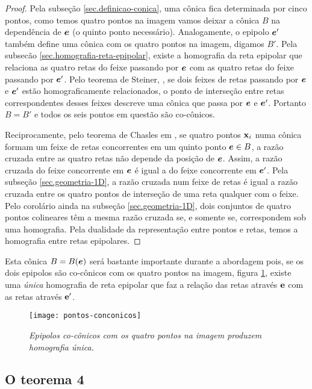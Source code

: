 \begin{proof}
Pela subseção \ref{sec.definicao-conica}, uma cônica fica determinada por cinco pontos, como temos quatro pontos na imagem vamos deixar a cônica $B$ na dependência de $\boldsymbol{e}$ (o quinto ponto necessário). Analogamente, o epipolo $\boldsymbol{e}'$ também define uma cônica com os quatro pontos na imagem, digamos $B'$. Pela subsec\~ao \ref{sec.homografia-reta-epipolar}, existe a homografia da reta epipolar que relaciona as quatro retas do feixe passando por $\boldsymbol{e}$ com as quatro retas do feixe passando por $\boldsymbol{e}'$. Pelo teorema de Steiner, \citep{kneebone}, se dois feixes de retas passando por $\boldsymbol{e}$ e $\boldsymbol{e}'$ estão homograficamente relacionados, o ponto de interseção entre retas correspondentes desses feixes descreve uma cônica que passa por $\boldsymbol{e}$ e $\boldsymbol{e}'$. Portanto $B=B'$ e todos os seis pontos em questão são co-cônicos.


Reciprocamente, pelo teorema de Chasles em \citep{kneebone}, se quatro pontos $\mathbf{x}_i$ numa cônica formam um feixe de retas concorrentes em um quinto ponto $\boldsymbol{e}\in B$, a razão cruzada entre as quatro retas não depende da posição de $\boldsymbol{e}$. Assim, a razão cruzada  do feixe concorrente em $\boldsymbol{e}$ é igual a do feixe concorrente em $\boldsymbol{e}'$. Pela subseção \ref{sec.geometria-1D}, a razão cruzada num feixe de retas é igual a razão cruzada entre os quatro pontos de interseção de uma reta qualquer com o feixe. Pelo corolário ainda na subseção \ref{sec.geometria-1D}, dois conjuntos de quatro pontos colineares têm a mesma razão cruzada se, e somente se, correspondem sob uma homografia.  Pela dualidade da representação entre pontos e retas, temos a homografia entre retas epipolares.  
\end{proof}

Esta cônica $B=B(\boldsymbol{e})$ será bastante importante durante a abordagem pois, se os dois epipolos são co-cônicos com os quatro pontos na imagem, figura \ref{pontos-conconicos}, existe uma \textit{única} homografia de reta epipolar que faz a relação das retas através ${\bf e}$ com as retas através ${\bf e'}$. 

\begin{figure}[!htb]
\centering
\texttt{[image: pontos-conconicos]}
\caption{\textit{Epipolos co-cônicos com os quatro pontos na imagem produzem homografia única.}}
\label{pontos-conconicos}
\end{figure}

\subsection{O teorema 4}\label{sec.demonstracao-teo-4}

